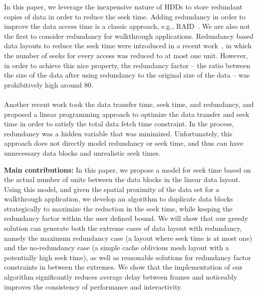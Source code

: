 
In this paper, we leverage the inexpensive nature of HDDs to store redundant
copies of data in order to reduce the seek time. Adding redundancy in order to
improve the data access time is a classic approach, e.g.,
RAID~\cite{Patterson88}.  We are also not the first to consider redundancy for
walkthrough applications.  Redundancy based data layouts to reduce the seek
time were introduced in a recent work~\cite{singleseeklayout}, in which the
number of seeks for every access was reduced to at most one unit. However, in
order to achieve this nice property, the redundancy factor -- the ratio between
the size of the data after using redundancy to the original size of the data --
was
prohibitively high around 80. \\
\\
Another recent work \cite{optimizingredundancy} took the data transfer time, seek time,
and redundancy, and proposed a linear programming approach to optimize the data
transfer and seek time in order to satisfy the total data fetch time
constraint. In the process, redundancy was a hidden variable that was
minimized. Unfortunately, this approach does not directly model redundancy or
seek time, and thus can have unnecessary data blocks and unrealistic seek
times.

{\bf Main contributions:}
In this paper, we propose a model for seek time based on the actual
number of units
between the data blocks in the linear data layout. Using this model, and given
the spatial proximity of the data set for a walkthrough application, we develop
an algorithm to duplicate data blocks strategically to maximize the reduction
in the seek time, while keeping the redundancy factor within the user defined
bound. We will show that our greedy solution can generate both the extreme cases
of data layout with redundancy, namely the maximum redundancy case
(a layout where seek time is at most one) and the no-redundancy case (a simple
cache oblivious mesh layout with a potentially high seek time), as well as
reasonable solutions for redundancy factor constraints in between the extremes.
We show that the
implementation of our algorithm significantly reduces average delay between
frames and noticeably improves the consistency of performance and
interactivity.

